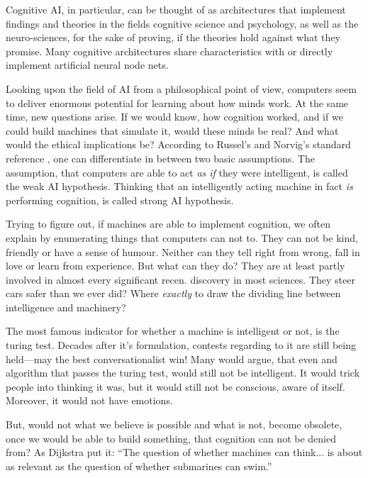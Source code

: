 Cognitive AI, in particular, can be thought of as architectures that implement findings and theories in the fields cognitive science and psychology, as well as the neuro-sciences, for the sake of proving, if the theories hold against what they promise. Many cognitive architectures share characteristics with or directly implement artificial neural node nets.

Looking upon the field of AI from a philosophical point of view, computers seem to deliver enormous potential for learning about how minds work. At the same time, new questions arise. If we would know, how cognition worked, and if we could build machines that simulate it, would these minds be real? And what would the ethical implications be? According to Russel's and Norvig's standard reference \cite{russell2009artificial}, one can differentiate in between two basic assumptions. The assumption, that computers are able to act \emph{as if} they were intelligent, is called the weak AI hypothesis. Thinking that an intelligently acting machine in fact \emph{is} performing cognition, is called strong AI hypothesis.

Trying to figure out, if machines are able to implement cognition, we often explain by enumerating things that computers can not to. They can not be kind, friendly or have a sense of humour. Neither can they tell right from wrong, fall in love or learn from experience. But what can they do? They are at least partly involved in almost every significant recen. discovery in most sciences. They steer cars safer than we ever did? Where \emph{exactly} to draw the dividing line between intelligence and machinery?~\cite{russell2009artificial}

The most famous indicator for whether a machine is intelligent or not, is the turing test. Decades after it's formulation, contests regarding to it are still being held---may the best conversationalist win! Many would argue, that even and algorithm that passes the turing test, would still not be intelligent. It would trick people into thinking it was, but it would still not be conscious, aware of itself. Moreover, it would not have emotions.~\cite{russell2009artificial}

But, would not what we believe is possible and what is not, become obsolete, once we would be able to build something, that cognition can not be denied from? As Dijkstra put it: ``The question of whether machines can think... is about as relevant as the question of whether submarines can swim.''

